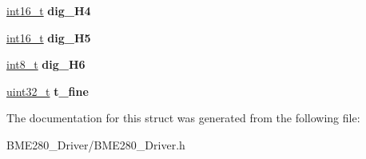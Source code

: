 \begin{DoxyCompactItemize}
\hyperlink{vl53l0x__types_8h_aa343fa3b3d06292b959ffdd4c4703b06}{int16\+\_\+t} {\bfseries dig\+\_\+\+H4}
\item 
\mbox{\label{structBM__CalibrationData_a050b7610712c6d301b283cf8e41c3c80}} 
\hyperlink{vl53l0x__types_8h_aa343fa3b3d06292b959ffdd4c4703b06}{int16\+\_\+t} {\bfseries dig\+\_\+\+H5}
\item 
\mbox{\label{structBM__CalibrationData_ac0edd6dc39577eaefac36302971aaf4c}} 
\hyperlink{vl53l0x__types_8h_aef44329758059c91c76d334e8fc09700}{int8\+\_\+t} {\bfseries dig\+\_\+\+H6}
\item 
\mbox{\label{structBM__CalibrationData_a51fc9a8c4ab2520b6076d9a2dc941325}} 
\hyperlink{vl53l0x__types_8h_a435d1572bf3f880d55459d9805097f62}{uint32\+\_\+t} {\bfseries t\+\_\+fine}
\end{DoxyCompactItemize}


The documentation for this struct was generated from the following file\+:\begin{DoxyCompactItemize}
\item 
B\+M\+E280\+\_\+\+Driver/B\+M\+E280\+\_\+\+Driver.\+h\end{DoxyCompactItemize}
